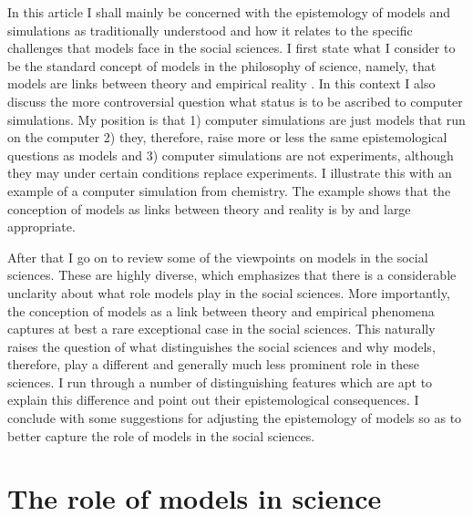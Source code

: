 \documentclass[onecollarge]{STJour}
\numberwithin{equation}{section}
\begin{document}
In this article I shall mainly be concerned with the
epistemology of models and simulations as traditionally understood and
how it relates to the specific challenges that models face in the
social sciences. 
I first state what I consider to be the standard
concept of models in the philosophy of science, namely, that
models are links between theory and empirical reality
\citep{morgan-morrison:1999, winsberg:2003}. In this context I also
discuss the more controversial question what status is to be ascribed to
computer simulations. My position is that 1) computer simulations are
just models that run on the computer 2) they, therefore, raise more or
less the same epistemological questions as models and 3) computer
simulations are not experiments, although they may under certain
conditions replace experiments. I illustrate this with an example of
a computer simulation from chemistry. The example shows that the
conception of models as links between theory and reality is by and large
appropriate. 

After that I go on to review some of the viewpoints on models in the
social sciences. These are highly diverse, which emphasizes that there is
a considerable unclarity about what role models play in the social
sciences. More importantly, the conception of models as a link between
theory and empirical phenomena captures at best a rare exceptional case
in the social sciences. This naturally raises the question of what
distinguishes the social sciences and why models, therefore, play a
different and generally much less prominent role in these sciences. I run
through a number of distinguishing features which are apt to explain this
difference and point out their epistemological consequences. I conclude
with some suggestions for adjusting the epistemology of models so as to
better capture the role of models in the social sciences.


\section{The role of models in science}
\end{document}
